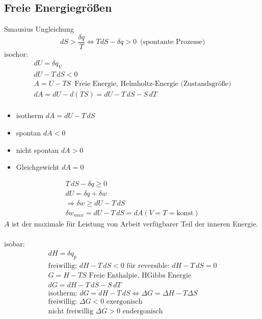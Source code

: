 \documentclass[a4paper, fleqn]{article}
\begin{document}
\subsection*{Freie Energiegrößen}
Smausius Ungleichung
\begin{equation*}
    dS > \frac{\delta q}{T} \Leftrightarrow TdS-\delta q > 0\,\text{ (spontante Prozesse)}
\end{equation*}
isochor:
\begin{eqnarray*}
    dU = \delta q_V\\
    dU-T\,dS < 0\\
    A = U-TS\,\text{ Freie Energie, Helmholtz-Energie (Zustandsgröße)}\\
    dA = dU-d(TS) = dU - T\,dS-S\,dT\\
\end{eqnarray*}
\begin{itemize}
    \item isotherm $dA = dU-T\,dS$
    \item spontan $dA<0$
    \item nicht spontan $dA > 0$
    \item Gleichgewicht $dA = 0$
\end{itemize}
\begin{eqnarray*}
    T\,dS-\delta q \geq 0\\
    dU = \delta q + \delta w\\
    \Rightarrow \delta w \geq dU - T\,dS\\
    \delta w_{max} = dU-T\,dS = dA (V=T=\mathrm{konst})
\end{eqnarray*}
$A$ ist der maximale für Leistung von Arbeit verfügbarer Teil der inneren Energie.\\
\\isobar:
\begin{eqnarray*}
    dH = \delta q_p\\
    \text{freiwillig: } dH-T\,dS<0\text{ für reversible: } dH-T\,dS=0\\
    G=H-TS \text{ Freie Enthalpie, HGibbs Energie}\\
    dG = dH-T\,dS-S\,dT\\
    \text{isotherm: } dG=dH-T\,dS \Leftrightarrow \Delta G = \Delta H-T\Delta S\\
    \text{freiwillig: } \Delta G < 0 \text{ exergonisch}\\
    \text{nicht freiwillig } \Delta G > 0 \text{ endergonisch}
\end{eqnarray*}
\end{document}

